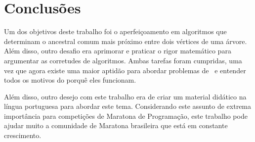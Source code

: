 \chapter{Conclusões}
\label{cap:conclusoes}

Um dos objetivos deste trabalho foi o aperfeiçoamento em algoritmos que determinam o ancestral comum mais próximo entre dois vértices de uma árvore. Além disso, outro desafio era aprimorar e praticar o rigor matemático para argumentar as corretudes de algoritmos. Ambas tarefas foram cumpridas, uma vez que agora existe uma maior aptidão para abordar problemas de \LCA\ e entender todos os motivos do porquê eles funcionam.

Além disso, outro desejo com este trabalho era de criar um material didático na língua portuguesa para abordar este tema. Considerando este assunto de extrema importância para competições de Maratona de Programação, este trabalho pode ajudar muito a comunidade de Maratona brasileira que está em constante crescimento.